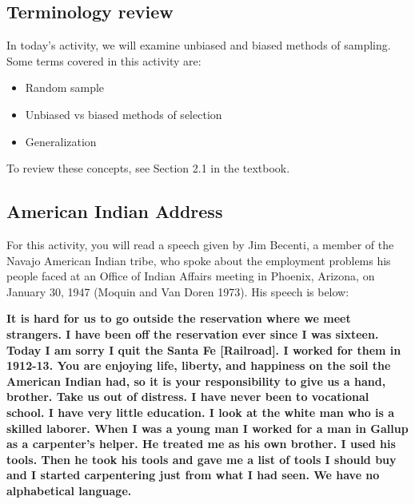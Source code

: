 \documentclass[
]{report}
\begin{document}
\hypertarget{terminology-review-1}{%
\subsection{Terminology review}\label{terminology-review-1}}

In today's activity, we will examine unbiased and biased methods of sampling. Some terms covered in this activity are:

\begin{itemize}
\item
  Random sample
\item
  Unbiased vs biased methods of selection
\item
  Generalization
\end{itemize}

To review these concepts, see Section 2.1 in the textbook.

\hypertarget{american-indian-address}{%
\subsection{American Indian Address}\label{american-indian-address}}

For this activity, you will read a speech given by Jim Becenti, a member of the Navajo American Indian tribe, who spoke about the employment problems his people faced at an Office of Indian Affairs meeting in Phoenix, Arizona, on January 30, 1947 (Moquin and Van Doren 1973). His speech is below:

\textbf{It is hard for us to go outside the reservation where we meet strangers. I have been off the reservation ever since I was sixteen. Today I am sorry I quit the Santa Fe {[}Railroad{]}. I worked for them in 1912-13. You are enjoying life, liberty, and happiness on the soil the American Indian had, so it is your responsibility to give us a hand, brother. Take us out of distress. I have never been to vocational school. I have very little education. I look at the white man who is a skilled laborer. When I was a young man I worked for a man in Gallup as a carpenter's helper. He treated me as his own brother. I used his tools. Then he took his tools and gave me a list of tools I should buy and I started carpentering just from what I had seen. We have no alphabetical language.}
\end{document}
